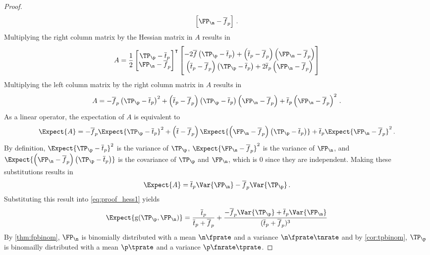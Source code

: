 \documentclass[ ../main.tex]{subfiles}
\begin{document}
{\begin{proof}
\begin{equation}
\begin{bmatrix}
        \FP_\n - \overline{f}_p
    \end{bmatrix}\,.
\end{equation}
Multiplying the right column matrix by the Hessian matrix in $A$ results in
\begin{equation}
    A = \frac{1}{2}
    \begin{bmatrix}
        \TP_\p - \overline{t}_p\\
        \FP_\n - \overline{f}_p
    \end{bmatrix}^{\intercal}
    \begin{bmatrix}
        -2 \overline{f} \left(\TP_\p - \overline{t}_p\right) + \left(\overline{t}_p-\overline{f}_p\right)\left(\FP_\n - \overline{f}_p\right)\\
        \left(\overline{t}_p-\overline{f}_p\right)\left(\TP_\p - \overline{t}_p\right) + 2 \overline{t}_p\left(\FP_\n - \overline{f}_p\right)
    \end{bmatrix}
\end{equation}
Multiplying the left column matrix by the right column matrix in $A$ results in
\begin{equation}
    A = -\overline{f}_p \left(\TP_\p - \overline{t}_p\right)^2 + 
    \left(\overline{t}_p-\overline{f}_p\right)\left(\TP_\p - 
    \overline{t}_p\right)\left(\FP_\n - \overline{f}_p\right) + 
    \overline{t}_p\left(\FP_\n - \overline{f}_p\right)^2\,.
\end{equation}
As a linear operator, the expectation of $A$ is equivalent to
\begin{equation}
\label{eq:proof_of_exp_precision_approx_1}
    \Expect{A} = -\overline{f}_p \Expect{\TP_\p - \overline{t}_p}^2 + \left(\overline{t}-\overline{f}_p\right)\Expect{\left(\FP_\n - \overline{f}_p\right)\left(\TP_\p - \overline{t}_p\right)} + \overline{t}_p\Expect{\FP_\n - \overline{f}_p}^2\,.
\end{equation}
By definition, $\Expect{\TP_\p - \overline{t}_p}^2$ is the variance of $\TP_\p$, $\Expect{\FP_\n - \overline{f}_p}^2$ is the variance of $\FP_\n$, and $\Expect{\left(\FP_\n - \overline{f}_p\right)\left(\TP_\p - \overline{t}_p\right)}$ is the covariance of $\TP_\p$ and $\FP_\n$, which is $0$ since they are independent.
Making these substitutions results in
\begin{equation}
    \Expect{A} = \overline{t}_p\Var{\FP_\n} - \overline{f}_p \Var{\TP_\p}\,.
\end{equation}
Substituting this result into \cref{eq:proof_hess1} yields
\begin{equation}
\label{eq:proof_hess2}
    \Expect{\operatorname{g}(\TP_\p,\FP_\n)} = 
    \frac{\overline{t}_p}{\overline{t}_p+\overline{f}_p} + 
    \frac{-\overline{f}_p \Var{\TP_\p} + 
    \overline{t}_p\Var{\FP_\n}}{(\overline{t}_p + \overline{f}_p)^3}
\end{equation}
By \cref{thm:fpbinom}, $\FP_\n$ is binomially distributed with a mean $\n \fprate$ and a variance $\n \fprate \tnrate$ and by \cref{cor:tpbinom}, $\TP_\p$ is binomailly distributed with a mean $\p \tprate$ and a variance $\p \fnrate \tprate$.
\end{proof}

}
\end{document}
